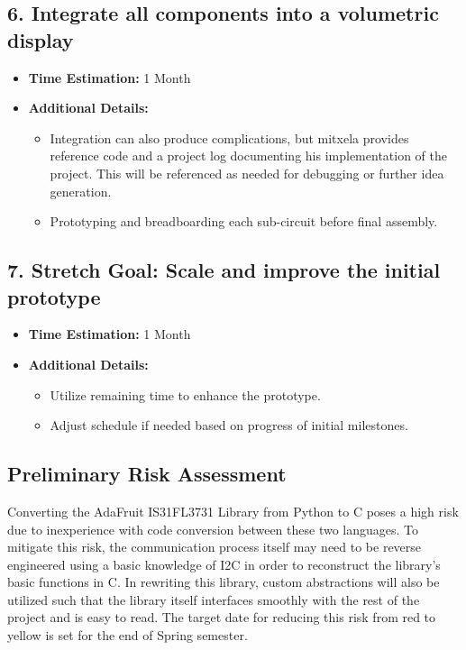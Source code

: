 \documentclass[11pt,journal]{IEEEtran}
\begin{document}
\subsection*{6. Integrate all components into a volumetric display}
\begin{itemize}
  \item \textbf{Time Estimation:} 1 Month
  \item \textbf{Additional Details:} 
  \begin{itemize}
    \item Integration can also produce complications, but mitxela provides reference code and a project log documenting his implementation of the project. This will be referenced as needed for debugging or further idea generation.
    \item Prototyping and breadboarding each sub-circuit before final assembly.
  \end{itemize}
\end{itemize}

\subsection*{7. Stretch Goal: Scale and improve the initial prototype}
\begin{itemize}
  \item \textbf{Time Estimation:} 1 Month
  \item \textbf{Additional Details:} 
  \begin{itemize}
    \item Utilize remaining time to enhance the prototype.
    \item Adjust schedule if needed based on progress of initial milestones.
  \end{itemize}
\end{itemize}


\subsection{Preliminary Risk Assessment}



Converting the AdaFruit IS31FL3731 Library from Python to C poses a high risk due to inexperience with code conversion between these two languages. To mitigate this risk, the communication process itself may need to be reverse engineered using a basic knowledge of I2C in order to reconstruct the library’s basic functions in C. In rewriting this library, custom abstractions will also be utilized such that the library itself interfaces smoothly with the rest of the project and is easy to read. The target date for reducing this risk from red to yellow is set for the end of Spring semester.
\end{document}
